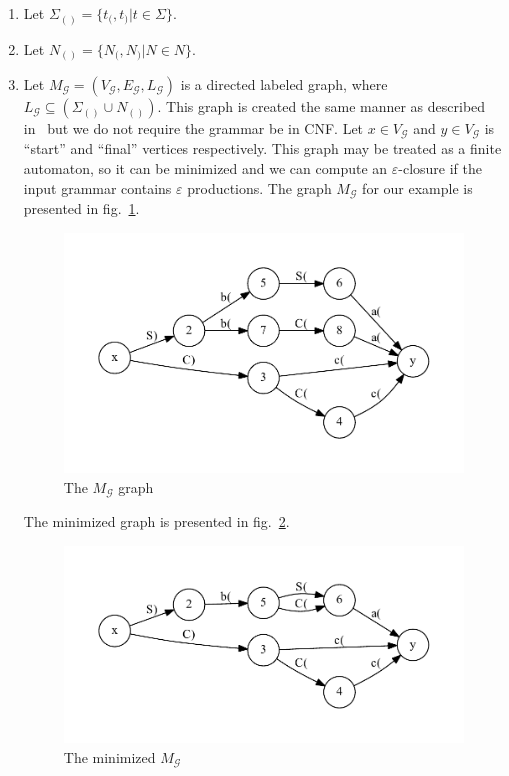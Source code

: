 \begin{enumerate}
\item Let $\Sigma_{()} =\{ t_( , t_)  | t \in \Sigma \}$.
\item Let $N_{()} = \{ N_( , N_) | N \in N  \}$.
\item Let $M_{\mathcal{G}} = (V_{\mathcal{G}}, E_{\mathcal{G}}, L_{\mathcal{G}})$ is a directed 
labeled graph, where $L_{\mathcal{G}} \subseteq (\Sigma_{()} \cup N_{()})$.
This graph is created the same manner as described in~\cite{OptimalDLR} but we do not require the grammar be in CNF.
Let $x \in V_{\mathcal{G}}$ and $y \in V_{\mathcal{G}}$ is ``start'' and ``final'' vertices respectively. 
This graph may be treated as a finite automaton, so it can be minimized and we can compute an $\varepsilon$-closure if the input grammar contains $\varepsilon$ productions.
The graph $M_{\mathcal{G}}$ for our example is presented in fig.~\ref{mod}.

\begin{figure}
\includegraphics[width=.5\textwidth]{dot/grammar_1.pdf}

\caption{The $M_{\mathcal{G}}$ graph}
\label{mod}

\end{figure}


The minimized graph is presented in fig.~\ref{minimized}.
\begin{figure}
\includegraphics[width=.5\textwidth]{dot/grammar_min.pdf}


\caption{The minimized $M_{\mathcal{G}}$}
\label{minimized}

\end{figure}



\end{enumerate}
